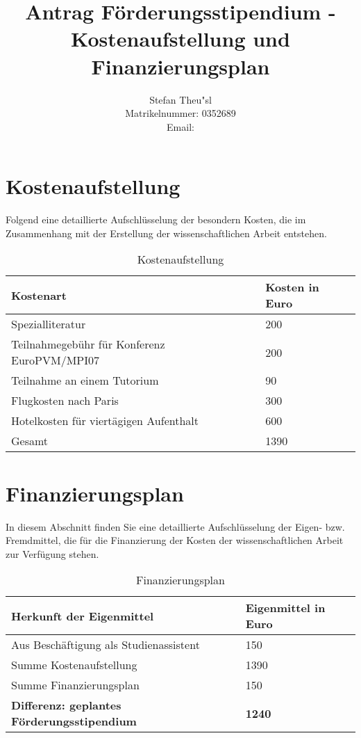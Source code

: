 \documentclass[a4paper,fleqn]{article}
\title{Antrag F\"orderungsstipendium - Kostenaufstellung und Finanzierungsplan}
\author{Stefan Theu"sl\\Matrikelnummer: 0352689\\Email: \email{h0352689@wu-wien.ac.at}}
\begin{document}
\maketitle

\section{Kostenaufstellung}

Folgend eine detaillierte Aufschl\"usselung der besondern Kosten, die
im Zusammenhang mit der Erstellung der wissenschaftlichen Arbeit
entstehen.

\begin{table}[ht]
  \centering
  \caption{Kostenaufstellung}
  \label{table:Kostenaufstellung}
  \begin{tabular}{|l|l|}
    \hline
    Kostenart                              & Kosten in Euro \\
    \hline
    Spezialliteratur                                & 200  \\
    Teilnahmegeb\"uhr f\"ur Konferenz EuroPVM/MPI07 & 200  \\
    Teilnahme an einem Tutorium                     &  90  \\
    Flugkosten nach Paris                           & 300  \\
    Hotelkosten f\"ur viert\"agigen Aufenthalt      & 600  \\
    \hline
    Gesamt                                          &1390  \\  
    \hline
  \end{tabular}
\end{table}


\section{Finanzierungsplan}

In diesem Abschnitt finden Sie eine detaillierte Aufschl\"usselung der
Eigen- bzw. Fremdmittel, die f\"ur die Finanzierung der Kosten der
wissenschaftlichen Arbeit zur Verf\"ugung stehen.

\begin{table}[ht]
  \centering
  \caption{Finanzierungsplan}
  \label{table:Finanzierungsplan}
  \begin{tabular}{|l|l|}
    \hline
    Herkunft der Eigenmittel         & Eigenmittel in Euro \\
    \hline
    Aus Besch\"aftigung als Studienassistent        & 150  \\
    \hline
    \hline
    Summe Kostenaufstellung                         &1390  \\
    Summe Finanzierungsplan                         & 150  \\
    \hline
    \textbf{Differenz: geplantes F\"orderungsstipendium}&\textbf{1240}\\
    \hline
  \end{tabular}
\end{table}
\end{document}
